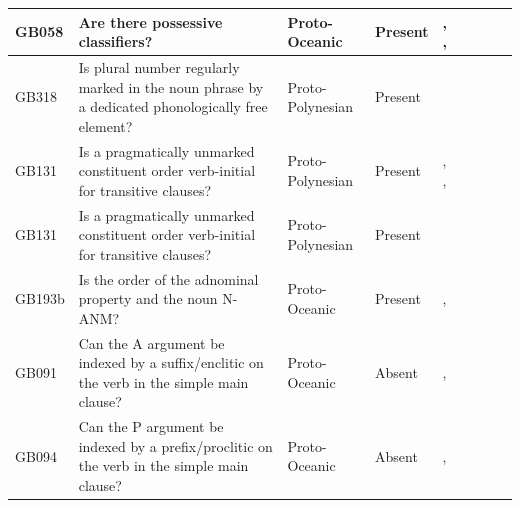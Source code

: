 \documentclass[draft,10pt]{article} %
\begin{document}
\begin{landscape}
\begin{longtable}{| p{2cm}| p{3cm}| p{2.5cm}|p{2cm}|p{2cm}|p{2cm}|p{2cm}|p{2cm}|p{2cm}|}
GB058&Are there possessive classifiers?&Proto-Oceanic&Present&\citet[154]{pawley1973some}, \citet[498]{ross2004morphosyntactic}, \citet[69, 77]{lynchrosscrowley_proto_grammar_oceanic}& \cellcolor{hedvig_lightgreen!50}{True Positive} & \cellcolor{hedvig_yellow!50}{Half} & \cellcolor{hedvig_lightgreen!50}{True Positive} & \cellcolor{hedvig_lightgreen!50}{True Positive} \\ \hline
GB318&Is plural number regularly marked in the noun phrase by a dedicated phonologically free element?&Proto-Polynesian&Present&\citet[59]{clark1976aspects}& \cellcolor{hedvig_lightgreen!50}{True Positive} & \cellcolor{hedvig_yellow!50}{Half} & \cellcolor{hedvig_lightgreen!50}{True Positive} & \cellcolor{hedvig_lightgreen!50}{True Positive} \\ \hline
GB131&Is a pragmatically unmarked constituent order verb-initial for transitive clauses?&Proto-Polynesian&Present&\citet[4]{marck2000_encyclo}, \citet[15]{chung1978}, \citet[118]{pawley1973some}& \cellcolor{hedvig_lightgreen!50}{True Positive} & \cellcolor{hedvig_lightgreen!50}{True Positive} & \cellcolor{hedvig_yellow!50}{Half} & \cellcolor{hedvig_lightgreen!50}{True Positive} \\ \hline
GB131&Is a pragmatically unmarked constituent order verb-initial for transitive clauses?&Proto-Polynesian&Present&\citet[122]{kikusawa2002proto}& \cellcolor{hedvig_lightgreen!50}{True Positive} & \cellcolor{hedvig_lightgreen!50}{True Positive} & \cellcolor{hedvig_yellow!50}{Half} & \cellcolor{hedvig_lightgreen!50}{True Positive} \\ \hline
GB193b&Is the order of the adnominal property and the noun N-ANM?&Proto-Oceanic&Present&\citet[497]{ross2004morphosyntactic}, \citet[74]{lynchrosscrowley_proto_grammar_oceanic}& \cellcolor{hedvig_lightgreen!50}{True Positive} & \cellcolor{hedvig_yellow!50}{Half} & \cellcolor{hedvig_lightgreen!50}{True Positive} & \cellcolor{hedvig_lightgreen!50}{True Positive} \\ \hline
GB091&Can the A argument be indexed by a suffix/enclitic on the verb in the simple main clause?&Proto-Oceanic&Absent&\citet[498-499]{ross2004morphosyntactic}, \citet[83]{lynchrosscrowley_proto_grammar_oceanic}& \cellcolor{hedvig_lightgreen!50}{True Negative} & \cellcolor{hedvig_yellow!50}{Half} & \cellcolor{hedvig_yellow!50}{True Negative} & \cellcolor{hedvig_yellow!50}{True Negative} \\ \hline
GB094&Can the P argument be indexed by a prefix/proclitic on the verb in the simple main clause?&Proto-Oceanic&Absent&\citet[498-499]{ross2004morphosyntactic}, \citet[83]{lynchrosscrowley_proto_grammar_oceanic}& \cellcolor{hedvig_lightgreen!50}{True Negative} & \cellcolor{hedvig_yellow!50}{Half} & \cellcolor{hedvig_yellow!50}{True Negative} & \cellcolor{hedvig_yellow!50}{True Negative} \\ \hline

\end{longtable}
\end{landscape}
\end{document}
